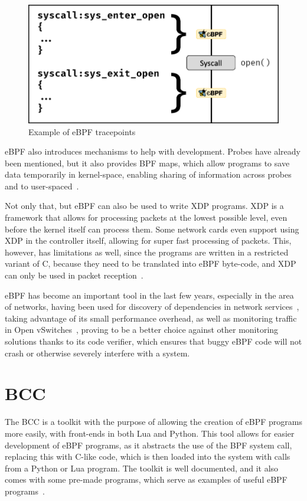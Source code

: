 \begin{figure}[htb]
   \centering
   \includegraphics[scale=.35]{syscall}
   \caption{Example of eBPF tracepoints}\label{fig:syscall}
\end{figure}

eBPF also introduces mechanisms to help with development. Probes have already
been mentioned, but it also provides BPF maps, which allow programs to save data
temporarily in kernel-space, enabling sharing of information across probes and
to user-spaced~\cite{lwm}.

Not only that, but eBPF can also be used to write \ac{XDP} programs. \ac{XDP} is
a framework that allows for processing packets at the lowest possible level,
even before the kernel itself can process them. Some network cards even support
using \ac{XDP} in the controller itself, allowing for super fast processing of
packets. This, however, has limitations as well, since the programs are written
in a restricted variant of C, because they need to be translated into eBPF
byte-code, and \ac{XDP} can only be used in packet reception~\cite{xdp}.

eBPF has become an important tool in the last few years, especially in the area
of networks, having been used for discovery of dependencies in network
services~\cite{ebpfeg1}, taking advantage of its small performance overhead, as
well as monitoring traffic in Open vSwitches~\cite{ebpfeg2}, proving to be a
better choice against other monitoring solutions thanks to its code verifier,
which ensures that buggy eBPF code will not crash or otherwise severely
interfere with a system.


\section{BCC}

The \ac{BCC} is a toolkit with the purpose of allowing the creation of eBPF
programs more easily, with front-ends in both Lua and Python. This tool allows
for easier development of eBPF programs, as it abstracts the use of the \ac{BPF}
system call, replacing this with C-like code, which is then loaded into the
system with calls from a Python or Lua program. The toolkit is well documented,
and it also comes with some pre-made programs, which serve as examples of useful
eBPF programs~\cite{gregg,bcc}.

